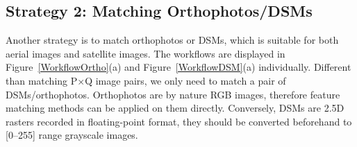 
\subsection{Strategy 2: Matching Orthophotos/DSMs}
Another strategy is to match orthophotos or DSMs, which is suitable for both aerial images and satellite images. The workflows are displayed in Figure~\ref{WorkflowOrtho}(a) and Figure~\ref{WorkflowDSM}(a) individually. Different than matching P$\times$Q image pairs, we only need to match a pair of DSMs/orthophotos.
Orthophotos are by nature RGB images, therefore feature matching methods can be applied on them directly. Conversely, DSMs are 2.5D rasters recorded in floating-point format, they should be converted beforehand to [0–255] range grayscale images.
\par
